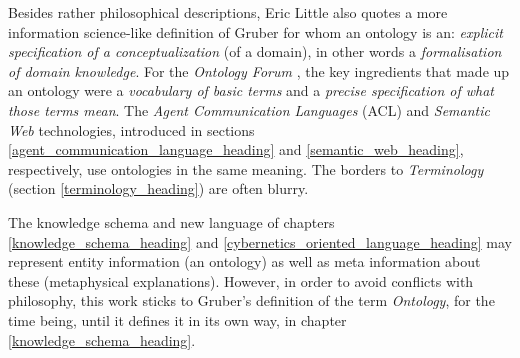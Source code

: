 Besides rather philosophical descriptions, Eric Little \cite{little} also
quotes a more information science-like definition of Gruber \cite{gruber} for
whom an ontology is an: \textit{explicit specification of a conceptualization}
(of a domain), in other words a \emph{formalisation of domain knowledge}. For
the \emph{Ontology Forum} \cite{ontologyorg}, the key ingredients that made up
an ontology were a \textit{vocabulary of basic terms} and a \textit{precise
specification of what those terms mean}. The \emph{Agent Communication Languages}
(ACL) and \emph{Semantic Web} technologies, introduced in sections
\ref{agent_communication_language_heading} and \ref{semantic_web_heading},
respectively, use ontologies in the same meaning. The borders to
\emph{Terminology} (section \ref{terminology_heading}) are often blurry.

The knowledge schema and new language of chapters \ref{knowledge_schema_heading}
and \ref{cybernetics_oriented_language_heading} may represent entity
information (an ontology) as well as meta information about these (metaphysical
explanations). However, in order to avoid conflicts with philosophy, this work
sticks to Gruber's definition of the term \emph{Ontology}, for the time being,
until it defines it in its own way, in chapter \ref{knowledge_schema_heading}.
